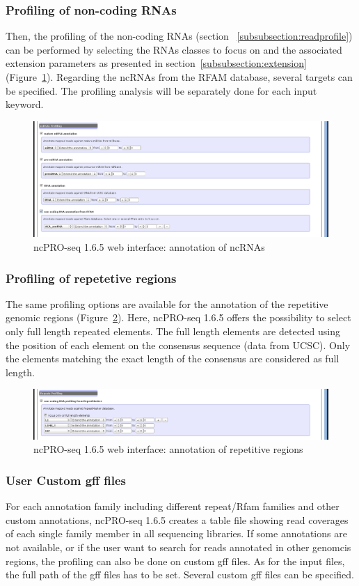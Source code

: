 \documentclass[12pt]{article}
\def \ncpip{ncPRO-seq 1.6.5}
\begin{document}
\subsubsection{Profiling of non-coding RNAs}
Then, the profiling of the non-coding RNAs (section ~\ref{subsubsection:readprofile}) can be performed by selecting the RNAs classes to focus on and the associated extension parameters as presented in section~\ref{subsubsection:extension} (Figure~\ref{fig:web3}).
Regarding the ncRNAs from the RFAM database, several targets can be specified. The profiling analysis will be separately done for each input keyword.\\
\begin{figure}[!h]
\includegraphics[width=\textwidth]{web_4.png}
\caption{\ncpip{} web interface: annotation of ncRNAs}
\label{fig:web3}
\end{figure} 
\subsubsection{Profiling of repetetive regions}
The same profiling options are available for the annotation of the repetitive genomic regions (Figure~\ref{fig:web5}). Here, \ncpip{} offers the possibility to select only full length repeated elements. The full length elements are detected using the position of each element on the consensus sequence (data from UCSC). Only the elements matching the exact length of the consensus are considered as full length. 
\begin{figure}[!h]
\includegraphics[width=\textwidth]{web_5.png}
\caption{\ncpip{} web interface: annotation of repetitive regions}
\label{fig:web5}
\end{figure}
\subsubsection{User Custom gff files}
For each annotation family including different repeat/Rfam families and other custom annotations, \ncpip{} creates a table file showing read coverages of each single family member in all sequencing libraries. If some annotations are not available, or if the user want to search for reads annotated in other genomcis regions, the profiling can also be done on custom gff files. As for the input files, the full path of the gff files has to be set. Several custom gff files can be specified.
\end{document}

